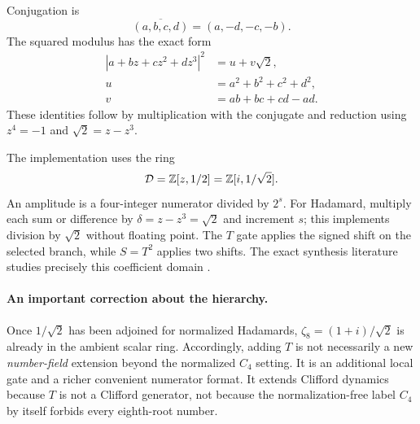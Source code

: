 Conjugation is
\begin{equation}
 \overline{(a,b,c,d)}=(a,-d,-c,-b).
\end{equation}
The squared modulus has the exact form
\begin{align}\label{eq:C8norm}
 |a+bz+cz^2+dz^3|^2&=u+v\sqrt2,\\
 u&=a^2+b^2+c^2+d^2,\nonumber\\
 v&=ab+bc+cd-ad.\nonumber
\end{align}
These identities follow by multiplication with the conjugate and reduction using $z^4=-1$ and $\sqrt2=z-z^3$.

The implementation uses the ring
\begin{equation}\label{eq:ring}
 \mathcal D=\mathbb Z[z,1/2]=\mathbb Z[i,1/\sqrt2].
\end{equation}
An amplitude is a four-integer numerator divided by $2^s$. For Hadamard, multiply each sum or difference by $\delta=z-z^3=\sqrt2$ and increment $s$; this implements division by $\sqrt2$ without floating point. The $T$ gate applies the signed shift on the selected branch, while $S=T^2$ applies two shifts. The exact synthesis literature studies precisely this coefficient domain \cite{giles,kmm}.

\paragraph{An important correction about the hierarchy.}
Once $1/\sqrt2$ has been adjoined for normalized Hadamards, $\zeta_8=(1+i)/\sqrt2$ is already in the ambient scalar ring. Accordingly, adding $T$ is not necessarily a new \emph{number-field} extension beyond the normalized $C_4$ setting. It is an additional local gate and a richer convenient numerator format. It extends Clifford dynamics because $T$ is not a Clifford generator, not because the normalization-free label $C_4$ by itself forbids every eighth-root number.

